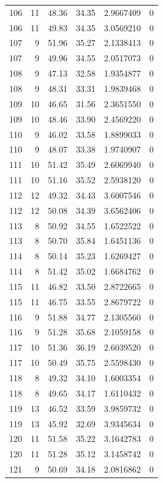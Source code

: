 \documentclass[
  letterpaper,
  DIV=11,
  numbers=noendperiod]{scrreprt}
\renewcommand{\[}{\begin{equation}}
\renewcommand{\]}{\end{equation}}
\begin{document}
\begin{table}
\begin{tabular*}{\linewidth}{@{\extracolsep{\fill}}rrrrrr}
106 & 11 & 48.36 & 34.35 & 2.9667409 & 0 \\ 
106 & 11 & 49.83 & 34.35 & 3.0569210 & 0 \\ 
107 & 9 & 51.96 & 35.27 & 2.1338413 & 0 \\ 
107 & 9 & 49.96 & 34.55 & 2.0517073 & 0 \\ 
108 & 9 & 47.13 & 32.58 & 1.9354877 & 0 \\ 
108 & 9 & 48.31 & 33.31 & 1.9839468 & 0 \\ 
109 & 10 & 46.65 & 31.56 & 2.3651550 & 0 \\ 
109 & 10 & 48.46 & 33.90 & 2.4569220 & 0 \\ 
110 & 9 & 46.02 & 33.58 & 1.8899033 & 0 \\ 
110 & 9 & 48.07 & 33.38 & 1.9740907 & 0 \\ 
111 & 10 & 51.42 & 35.49 & 2.6069940 & 0 \\ 
111 & 10 & 51.16 & 35.52 & 2.5938120 & 0 \\ 
112 & 12 & 49.32 & 34.43 & 3.6007546 & 0 \\ 
112 & 12 & 50.08 & 34.39 & 3.6562406 & 0 \\ 
113 & 8 & 50.92 & 34.55 & 1.6522522 & 0 \\ 
113 & 8 & 50.70 & 35.84 & 1.6451136 & 0 \\ 
114 & 8 & 50.14 & 35.23 & 1.6269427 & 0 \\ 
114 & 8 & 51.42 & 35.02 & 1.6684762 & 0 \\ 
115 & 11 & 46.82 & 33.50 & 2.8722665 & 0 \\ 
115 & 11 & 46.75 & 33.55 & 2.8679722 & 0 \\ 
116 & 9 & 51.88 & 34.77 & 2.1305560 & 0 \\ 
116 & 9 & 51.28 & 35.68 & 2.1059158 & 0 \\ 
117 & 10 & 51.36 & 36.19 & 2.6039520 & 0 \\ 
117 & 10 & 50.49 & 35.75 & 2.5598430 & 0 \\ 
118 & 8 & 49.32 & 34.10 & 1.6003354 & 0 \\ 
118 & 8 & 49.65 & 34.17 & 1.6110432 & 0 \\ 
119 & 13 & 46.52 & 33.59 & 3.9859732 & 0 \\ 
119 & 13 & 45.92 & 32.69 & 3.9345634 & 0 \\ 
120 & 11 & 51.58 & 35.22 & 3.1642783 & 0 \\ 
120 & 11 & 51.28 & 35.12 & 3.1458742 & 0 \\ 
121 & 9 & 50.69 & 34.18 & 2.0816862 & 0 \\ 

\end{tabular*}
\end{table}
\end{document}
